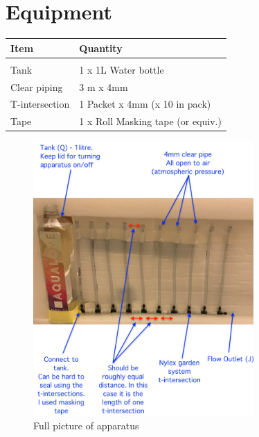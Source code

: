 \documentclass{article}
\begin{document}

\section{Equipment}
\label{equipment}

\begin{tabular}{ll}
  Item & Quantity \\
  \hline \\
  Tank & 1 x 1L Water bottle \\
  Clear piping & 3 m x 4mm \\
  T-intersection & 1 Packet x 4mm (x 10 in pack) \\
  Tape & 1 x Roll Masking tape (or equiv.) \\
\end{tabular}


\begin{figure}[h]
  \begin{center}
    \includegraphics[width=0.75\textwidth]{full} %
    \caption{Full picture of apparatus}
    \label{fig:fullApparatus}
  \end{center}
\end{figure}
\end{document}
